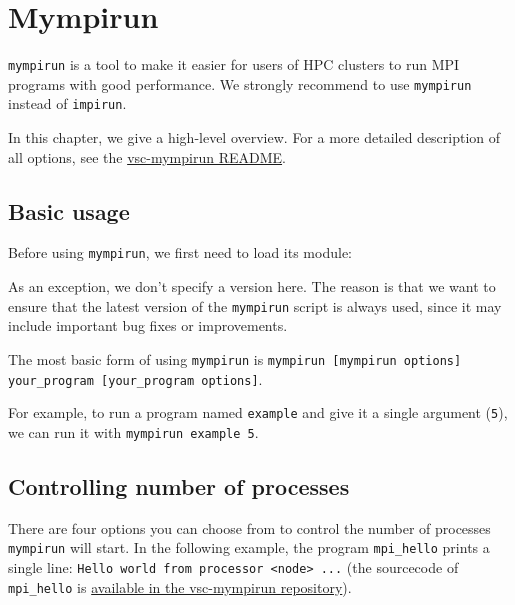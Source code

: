\chapter{Mympirun}
\label{ch:mympirun}

\lstinline|mympirun| is a tool to make it easier for users of HPC clusters to run
MPI programs with good performance. We strongly recommend to use \lstinline|mympirun|
instead of \lstinline|impirun|.

In this chapter, we give a high-level overview. For a more detailed description of all
options, see the
\href{https://github.com/hpcugent/vsc-mympirun/blob/master/README.md}{vsc-mympirun README}.

\section{Basic usage}
\label{sec:myrun-basic-usage}

Before using \lstinline|mympirun|, we first need to load its module:

\begin{prompt}
\end{prompt}

As an exception, we don't specify a version here. The reason is that we want to ensure
that the latest version of the \lstinline|mympirun| script is always used, since it may
include important bug fixes or improvements.

The most basic form of using \lstinline|mympirun| is \lstinline|mympirun [mympirun options] your_program [your_program options]|.

For example, to run a program named \lstinline|example| and give it a single argument (\lstinline|5|),
we can run it with \lstinline|mympirun example 5|.


\section{Controlling number of processes}
\label{sec:mympirun-controlling-number-of-processes}

There are four options you can choose from to control the number of processes
\lstinline|mympirun| will start. In the following example, the program \lstinline|mpi_hello|
prints a single line: \lstinline|Hello world from processor <node> ...| (the sourcecode of
\lstinline|mpi_hello| is \href{https://github.com/hpcugent/vsc-mympirun/blob/master/testscripts/mpi_helloworld.c}{available in the vsc-mympirun repository}).

